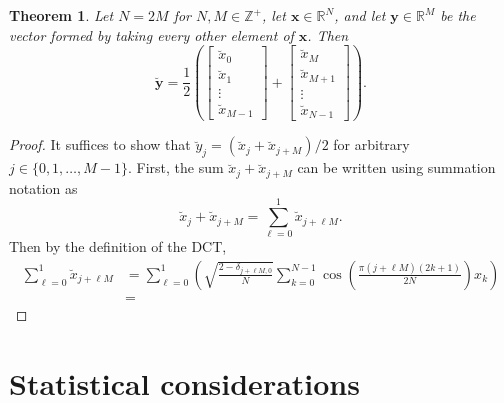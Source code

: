 \documentclass[12pt]{article}
\newcommand{\dct}[1]{\breve{#1}}	%
\newtheorem{theorem}{Theorem}[section]
\begin{document}
\begin{theorem}
\label{thm:DCT and Aliasing}
Let $N = 2M$ for $N,M \in \mathbb{Z}^+$, let $\mathbf{x} \in \mathbb{R}^N$, and let $\mathbf{y} \in \mathbb{R}^M$ be the vector formed by taking every other element of $\mathbf{x}$. Then
\[\dct{\mathbf{y}} = \frac{1}{2}\left(\begin{bmatrix}
\dct{x}_0 \\
\dct{x}_1 \\
\vdots \\
\dct{x}_{M-1}
\end{bmatrix}
 + \begin{bmatrix}
\dct{x}_M \\
\dct{x}_{M+1} \\
\vdots \\
\dct{x}_{N-1}\end{bmatrix}
\right).\]
\end{theorem}
\begin{proof}
It suffices to show that $\dct{y}_j = (\dct{x}_j + \dct{x}_{j+M})/2$ for arbitrary $j \in \{0,1,\ldots,M-1\}$. First, the sum $\dct{x}_j + \dct{x}_{j+M}$ can be written using summation notation as
\[\dct{x}_j + \dct{x}_{j+M} = \sum_{\ell=0}^1 \dct{x}_{j + \ell{M}}.\]
Then by the definition of the DCT,
\begin{align*}
\sum_{\ell=0}^1 \dct{x}_{j + \ell{M}} &= \sum_{\ell=0}^1 \left(\sqrt{\frac{2 - \delta_{j+\ell{M},0}}{N}} \sum_{k=0}^{N-1} \cos\left(\frac{\pi(j+\ell{M})(2k + 1)}{2N}\right) x_k\right) \\
&= 
\end{align*}
\end{proof}

\section{Statistical considerations} \label{sec:Stats.}
\end{document}

